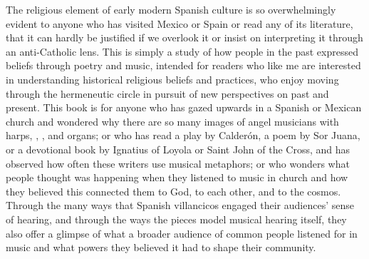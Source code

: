 The religious element of early modern Spanish culture is so overwhelmingly
evident to anyone who has visited Mexico or Spain or read any of its
literature, that it can hardly be justified if we overlook it or insist on
interpreting it through an anti-Catholic lens.
This is simply a study of how people in the past expressed beliefs through
poetry and music, intended for readers who like me are interested in
understanding historical religious beliefs and practices, who enjoy moving
through the hermeneutic circle in pursuit of new perspectives on past and
present.%
    \citXXX[ricoeur]
This book is for anyone who has gazed upwards in a Spanish or Mexican church
and wondered why there are so many images of angel musicians with harps,
, , and organs; or who has read a play by
Calderón, a poem by Sor Juana, or a devotional book by Ignatius of Loyola or
Saint John of the Cross, and has observed how often these writers use musical
metaphors; or who wonders what people thought was happening when they listened
to music in church and how they believed this connected them to God, to each
other, and to the cosmos.
Through the many ways that Spanish villancicos engaged their audiences' sense
of hearing, and through the ways the pieces model musical hearing itself, they
also offer a glimpse of what a broader audience of common people listened for
in music and what powers they believed it had to shape their community.
\endinput

\section{Music about Music in the Villancico Genre}

